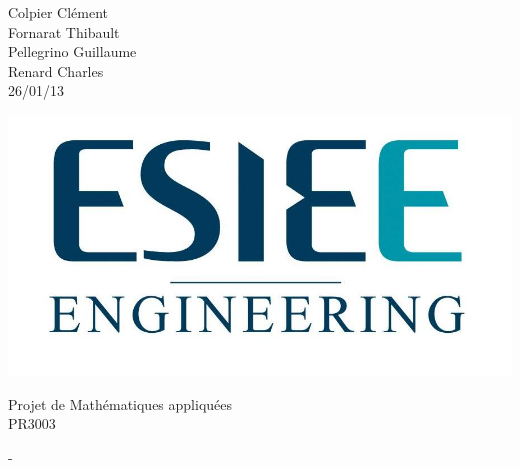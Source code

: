 \documentclass[10pt,a4paper]{article}
\begin{document}


\begin{minipage}{0.5\linewidth} %
Colpier Clément\\
Fornarat Thibault\\
Pellegrino Guillaume\\
Renard Charles\\



26/01/13
\end{minipage}
\begin{minipage}{0.5\linewidth}
\begin{flushright}
\includegraphics[scale=0.2]{logo-esiee.jpg}

\end{flushright}
\end{minipage}


\vspace{8cm}

\begin{center}
\LARGE Projet de Mathématiques appliquées \\
\-
\LARGE PR3003
\\

\end{center}




\newpage
-
\newpage
\tableofcontents              %
\clearpage
\end{document}
